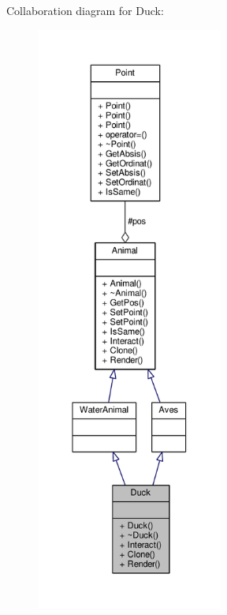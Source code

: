 Collaboration diagram for Duck\+:
\nopagebreak
\begin{figure}[H]
\begin{center}
\leavevmode
\includegraphics[height=550pt]{classDuck__coll__graph}
\end{center}
\end{figure}
